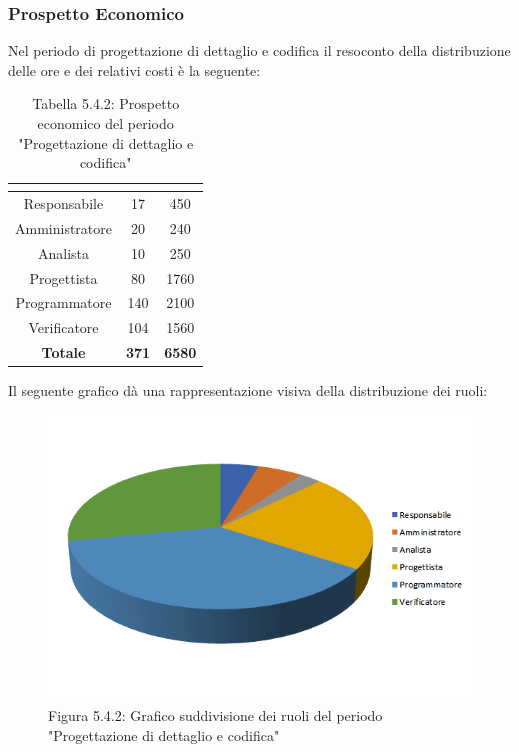 \subsubsection{Prospetto Economico}
Nel periodo di progettazione di dettaglio e codifica il resoconto della distribuzione delle ore e dei relativi costi è la seguente:

\renewcommand{\arraystretch}{1.5}
\begin{table}[H]
\begin{center}
\begin{tabular}{|c|c|c|}
\hline
\rowcolor{title_row}
\textbf{\color{title_text}{Ruolo}}  & \textbf{\color{title_text}{Ore}} & \textbf{\color{title_text}{Costo in \euro}} \\ \hline
Responsabile    & 17           & 450                 \\ \hline
Amministratore  & 20           & 240                 \\ \hline
Analista        & 10           & 250                 \\ \hline
Progettista     & 80           & 1760                \\ \hline
Programmatore   & 140          & 2100                \\ \hline
Verificatore    & 104          & 1560                \\ \hline
\textbf{Totale} & \textbf{371}    & \textbf{6580}           \\ \hline
\end{tabular}
\caption{Tabella 5.4.2: Prospetto economico del periodo "Progettazione di dettaglio e codifica"\label{}}
\end{center}
\end{table}
\renewcommand{\arraystretch}{1}

Il seguente grafico dà una rappresentazione visiva della distribuzione dei ruoli: \\
\begin{figure} [H]
	\centering
	\includegraphics[scale=1]{Res/ExcelGrafici/Grafici/CodificaRuoli.png}
	\caption{Figura 5.4.2: Grafico suddivisione dei ruoli del periodo "Progettazione di dettaglio e codifica"}\label{}
\end{figure}

\pagebreak